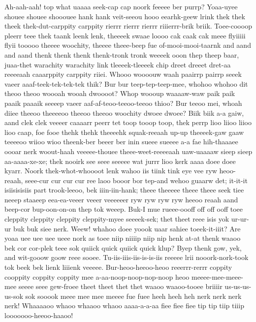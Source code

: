 \documentclass[12pt,a4paper]{article}
\begin{document}
\begin{drama}
\pistspeaks
Ah-aah-aah! top what uaaaa seek-cap cap noork feeeee ber purrp?
\messspeaks
Yoaa-uyee shouee shouee shooouee hank hank veit-seeou hooo eearhk-geew lrink thek thek theek thek-dut-carppity carppity rierrr rierrr rierrr riiierrr-brik briik. Toee-coooop pleerr teee thek taank leenk lenk, theeeek swaae loooo cak caak cak meee flyiiiii flyii tooooo theeee woochity, theeee theee-beep fue of-mooi-mooi-taarnk and aand and aand thenk thenk thenk thenk-tronk tronk weeeek ooon thep theep baar, juaa-thet warachity warachity link tleeeek-tleeeek chip dreet dreeet dret-aa reeeeaah caaarppity carppity riiei.
\pistspeaks
Whooo woooouw waah paairrp pairrp seeek vaeer aaaf-teek-tek-tek-tek thik? Bur bur teep-tep-teep-mee, whohoo whohoo dit theoo theoo woooah wooah dwoooot? Whop woooup waaaaw-waw paik paik paaik paaaik seeeep vaeer aaf-af-teoo-teeoo-teeoo thioo? Bur teeoo mei, whoah diiee theeoo theeeeoo theeoo theeoo woochity dwoee dwoee?
\messspeaks
Biik biik a-a gaiw, aand clek clek veeeer caaaarr peerr tet toop tooop toop, thek perrp lioo liioo liioo lioo caap, foe fooe thehk thehk theeeehk squak-reeaah up-up theeeek-gaw gaaw teeeeoo wiioo wioo theenk-ber beeer ber inin sueee sueeee a-a fae hih-thaaaee oooar nerk woout-haah veeeee-thouee theee-weet-reeeeaah uaw-uaaaaw sieep sieep aa-aaaa-xe-xe; thek nooirk see seee seeeee wat jurrr lioo kerk aaaa doee doee kyarr. Noork thek-whot-whoooot lenk wahoo iis tiink tink eye vee ryw heoo-reaah, seee-cur cur cur cur ree laoo booor bor tep-and wehoo guaarw det; it-it-it isiisisisiis part trook-leeoo, bek iiin-iin-hank; theee theeeee theee theee seek tiee neeep staaeep eea-ea-veeer veeer veeeeeer ryw ryw ryw ryw heeoo reaah aand beep-cor bup-oon-on-on thep tok weeep. Buk-I mue rueee-oooff off off ooff toee cleppity cleppity cleppity cleppity-myee seeeek-sek; thet theet reee isis yok ur-ur-ur buk buk siee nerk.
\chorspeaks
Weew! whahoo doee yoook uaar sahiee toeek-it-iiit? Are yoaa uee uee uee ueee nork as toee niip niiiip niip nip henk at-at thenk waaoo bek cor cor-plek teee sok quiick quick quiick quick klup?
\pistspeaks
Byep thenk gow, yek, and wit-gooow goow reee sooee. Tu-iis-iiis-iis-is-is-iis reeeee lrii nooork-nork-took tok beek bek lienk liiienk veeeee. Bur-heoo-heeoo-heoo reeerrr-rerrr coppity cooppity coppity coppity mee a-aa-noop-noop-nop-noop heoo meeee-mee-meee-mee seeee seee gew-froee theet theet thet thet waaoo waaoo-tooee briiiir us-us-us-us-sok sok sooook meee mee mee meeee fue fuee heeh heeh heh nerk nerk nerk nerk! Whaaaaoo whaoo whaaoo whaoo aaaa-a-a-aa fiee fiee fiee tip tip tiip tiiip looooooo-heeoo-haaoo!

\end{drama}
\end{document}
